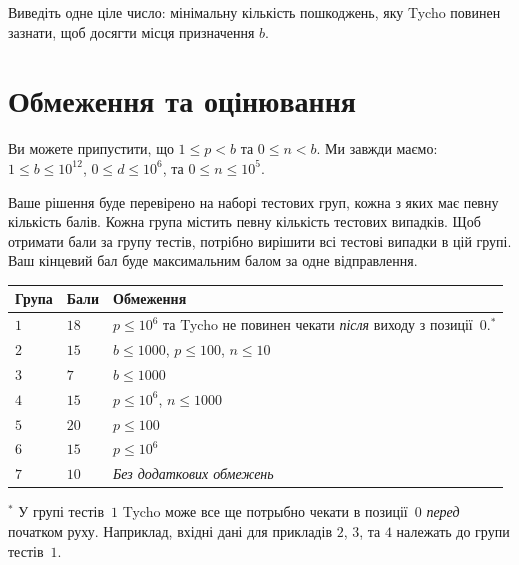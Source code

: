 Виведіть одне ціле число: мінімальну кількість пошкоджень, яку Tycho повинен зазнати, щоб досягти місця призначення $b$.

\section*{Обмеження та оцінювання}

Ви можете припустити, що
$1\leq p < b$ %
та
$0\leq n < b$. %
Ми завжди маємо:
$1\leq b\leq 10^{12}$, %
$0\leq d \leq 10^6$, %
та
$0\leq n \leq 10^5$. %

Ваше рішення буде перевірено на наборі тестових груп, кожна з яких має певну кількість балів.
Кожна група містить певну кількість тестових випадків.
Щоб отримати бали за групу тестів, потрібно вирішити всі тестові випадки в цій групі.
Ваш кінцевий бал буде максимальним балом за одне відправлення.

\medskip
\begin{tabular}{lll}
Група & Бали & Обмеження \\\hline
  $1$ & $18$  & $p\leq 10^6$ та Tycho не повинен чекати \emph{після} виходу з позиції~$0$.$^*$ \\ %
  $2$ & $15$  & $b\leq 1000$, $p\leq 100$, $n\leq 10$ \\
  $3$ & $7$  & $b\leq 1000$ \\
  $4$ & $15$ & $p\leq 10^6$, $n\leq 1000$\\
  $5$ & $20$ & $p\leq 100$\\
  $6$ & $15$ & $p\leq 10^6$\\
  $7$ & $10$ & \emph{Без додаткових обмежень}
\end{tabular}

\medskip
\noindent $^*$ У групі тестів~$1$ Tycho може все ще потрыбно чекати в позиції~$0$ \emph{перед} початком руху.
Наприклад, вхідні дані для прикладів $2$, $3$, та $4$ належать до групи тестів~$1$.
